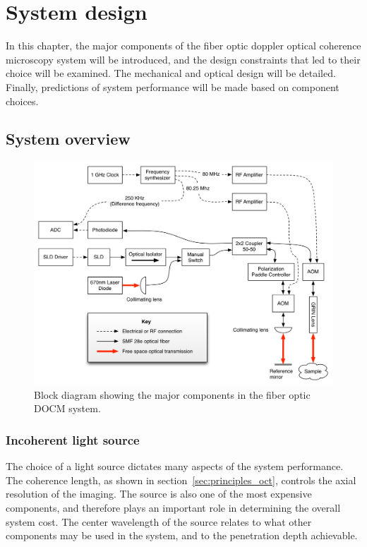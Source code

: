 \chapter{System design}

In this chapter, the major components of the fiber optic doppler optical coherence microscopy system will be introduced, and the design constraints that led to their choice will be examined. The mechanical and optical design will be detailed. Finally, predictions of system performance will be made based on component choices.

\section{System overview}

\begin{figure}[h!]
\centering
\includegraphics[width=1.1\textwidth]{Images/Background/actual_system_vertical.png}
\caption{Block diagram showing the major components in the fiber optic DOCM system.}
\end{figure}

\subsection{Incoherent light source}

The choice of a light source dictates many aspects of the system performance. The coherence length, as shown in section~\ref{sec:principles_oct}, controls the axial resolution of the imaging. The source is also one of the most expensive components, and therefore plays an important role in determining the overall system cost. The center wavelength of the source relates to what other components may be used in the system, and to the penetration depth achievable.

